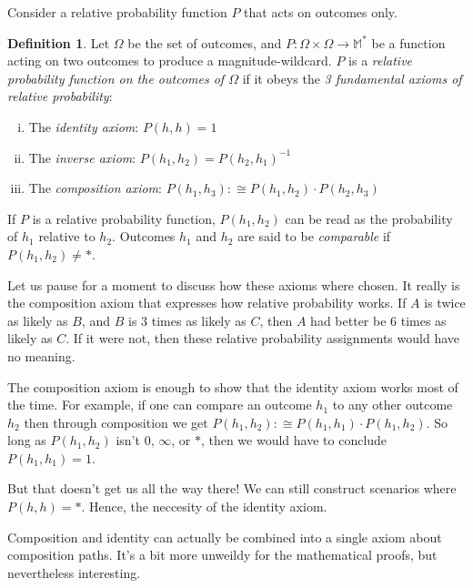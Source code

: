 \documentclass[twoside]{article}
\theoremstyle{plain}%
\theoremstyle{definition}
\newtheorem{definition}{Definition}[section]
\theoremstyle{remark}
\begin{document}
Consider a relative probability function \(P\) that acts on outcomes only.

\begin{definition}
\label{def:fundamental_laws}
Let \(\Omega\) be the set of outcomes, and \(P: \Omega \times \Omega \rightarrow \mathbb{M}^*\) be a function acting on two outcomes to produce a magnitude-wildcard. \(P\) is a \textit{relative probability function on the outcomes of \(\Omega\)} if it obeys the \textit{3 fundamental axioms of relative probability}:

\begin{enumerate}[(i)]
\item The \textit{identity axiom}: \(P(h, h) = 1\)
\item The \textit{inverse axiom}: \(P(h_1, h_2) = P(h_2, h_1)^{-1}\)
\item The \textit{composition axiom}: \(P(h_1, h_3) :\cong P(h_1, h_2) \cdot P(h_2, h_3)\)
\end{enumerate}

\end{definition}

If \(P\) is a relative probability function, \(P(h_1, h_2)\) can be read as the probability of \(h_1\) relative to \(h_2\). Outcomes \(h_1\) and \(h_2\) are said to be \textit{comparable} if \(P(h_1, h_2) \neq \ast\).

Let us pause for a moment to discuss how these axioms where chosen. It really is the composition axiom that expresses how relative probability works. If \(A\) is twice as likely as \(B\), and \(B\) is 3 times as likely as \(C\), then \(A\) had better be 6 times as likely as \(C\). If it were not, then these relative probability assignments would have no meaning.

The composition axiom is enough to show that the identity axiom works most of the time. For example, if one can compare an outcome \(h_1\) to any other outcome \(h_2\) then through composition we get \(P(h_1, h_2) :\cong P(h_1, h_1) \cdot P(h_1, h_2)\). So long as \(P(h_1, h_2)\) isn't \(0\), \(\infty\), or \(\ast\), then we would have to conclude \(P(h_1, h_1) = 1\).

But that doesn't get us all the way there! We can still construct scenarios where \(P(h, h) = \ast\). Hence, the neccesity of the identity axiom.

Composition and identity can actually be combined into a single axiom about composition paths. It's a bit more unweildy for the mathematical proofs, but nevertheless interesting.
\end{document}

